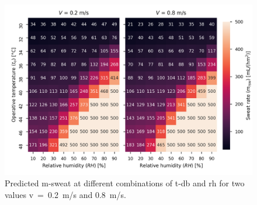 \begin{figure}[thb!]
    \centering
    \includegraphics[width=\textwidth]{figures/sweat_rate}
    \caption{Predicted \acf{m-sweat} at different combinations of \acf{t-db} and \acf{rh} for two values \acf{v}~=~0.2~m/s and 0.8~m/s.}
    \label{fig:sweat_rate}
\end{figure}

